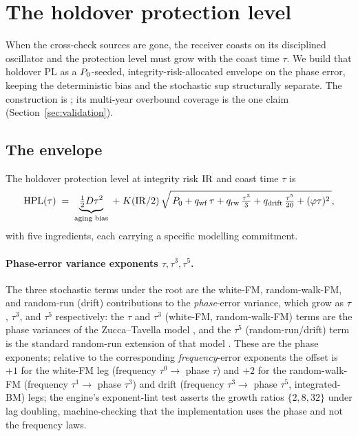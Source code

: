 \section{The holdover protection level}
\label{sec:holdover}

When the cross-check sources are gone, the receiver coasts on its disciplined
oscillator and the protection level must grow with the coast time $\tau$. We build
that holdover PL as a $P_0$-seeded, integrity-risk-allocated envelope on the
phase error, keeping the deterministic bias and the stochastic sup structurally
separate. The construction is \Proven{}; its multi-year overbound coverage is the
one \Validated{} claim (Section~\ref{sec:validation}).

\subsection{The envelope}
\label{sec:hplenvelope}

The holdover protection level at integrity risk $\mathrm{IR}$ and coast time $\tau$ is
\begin{equation}
  \mathrm{HPL}(\tau) \;=\; \underbrace{\tfrac12 D\tau^{2}}_{\text{aging bias}}
  \;+\;
  K(\mathrm{IR}/2)\,
  \sqrt{\,P_0
        + q_{\mathrm{wf}}\,\tau
        + q_{\mathrm{rw}}\,\tfrac{\tau^{3}}{3}
        + q_{\mathrm{drift}}\,\tfrac{\tau^{5}}{20}
        + (\varphi\tau)^{2}\,},
  \label{eq:hpl}
\end{equation}
with five ingredients, each carrying a specific modelling commitment.

\paragraph{Phase-error variance exponents $\tau,\tau^{3},\tau^{5}$.}
The three stochastic terms under the root are the white-FM, random-walk-FM, and
random-run (drift) contributions to the \emph{phase}-error variance, which grow as
$\tau$, $\tau^{3}$, and $\tau^{5}$ respectively: the $\tau$ and $\tau^{3}$
(white-FM, random-walk-FM) terms are the phase variances of the Zucca--Tavella
model \citep{zucca2005}, and the $\tau^{5}$ (random-run/drift) term is the standard
random-run extension of that model \citep{riley2008}. These are the phase exponents;
relative to the corresponding \emph{frequency}-error exponents the offset is $+1$
for the white-FM leg (frequency $\tau^{0}\!\to$ phase $\tau$) and $+2$ for the
random-walk-FM (frequency $\tau^{1}\!\to$ phase $\tau^{3}$) and drift (frequency
$\tau^{3}\!\to$ phase $\tau^{5}$, integrated-BM) legs; the engine's exponent-lint
test
 asserts the growth ratios
$\{2,8,32\}$ under lag doubling, machine-checking that the implementation uses the
phase and not the frequency laws.

